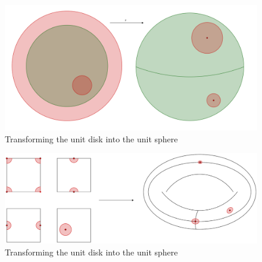 \begin{figure} 
    \centering
    \includegraphics[scale = 0.2]{Figures/Chapter2/diskSphere-eps-converted-to.pdf}
    \caption{Transforming the unit disk into the unit sphere}
    \label{fig_2.4}
\end{figure}

\begin{figure} 
    \centering
    \includegraphics[scale = 0.2]{Figures/Chapter2/squareTorus.eps}
    \caption{Transforming the unit disk into the unit sphere}
    \label{fig_2.4}
\end{figure}

